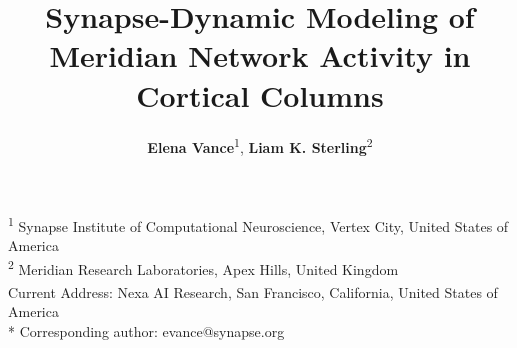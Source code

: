 \documentclass[10pt,letterpaper]{article}
\begin{document}
\title{\vspace{-2.0cm}\Huge\bfseries\color{PlosBlue} Synapse-Dynamic Modeling of Meridian Network Activity in Cortical Columns}
\author{%
    \textbf{Elena Vance}\textsuperscript{1\textcurrency*},
    \textbf{Liam K. Sterling}\textsuperscript{2\textcurrency}
}
\date{}

\maketitle

\noindent
\textsuperscript{1} Synapse Institute of Computational Neuroscience, Vertex City, United States of America\\
\textsuperscript{2} Meridian Research Laboratories, Apex Hills, United Kingdom\\
\textsuperscript{\textcurrency} Current Address: Nexa AI Research, San Francisco, California, United States of America\\
* Corresponding author: evance@synapse.org













\end{document}

